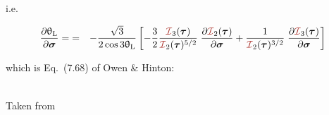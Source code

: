 i.e.
\begin{mdframed}[backgroundcolor=blue!5]
\begin{eqnarray}
\frac{\partial \uptheta_{\rm L}}{\partial \bm\sigma}
=
&=&
-\frac{\sqrt{3}}{2\cos 3\uptheta_{\rm L}}
\left[
-\frac32  \frac{ {\III}_3(\bm\tau)   }{ {\III}_2(\bm\tau)^{5/2}}
\; \frac{\partial {\III}_2(\bm\tau)}{\partial \bm\sigma} 
+  \frac{1}{{\III}_2(\bm\tau)^{3/2}} 
\; \frac{\partial  {\III}_3(\bm\tau)}{\partial \bm\sigma} 
\right]
\end{eqnarray}
\end{mdframed}
which is Eq.~(7.68) of Owen \& Hinton:
\begin{center}
\\
{\captionfont Taken from \textcite{owhi}}
\end{center}


